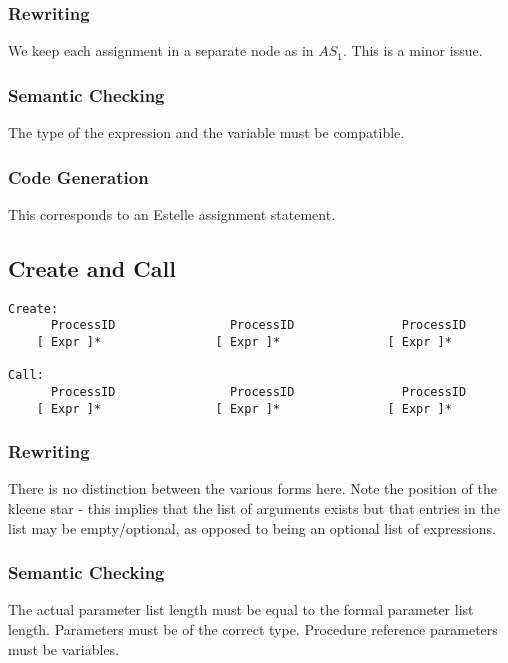 \subsubsection{Rewriting}

We keep each assignment in a separate node as in $AS_1$. This is a
minor issue.

\subsubsection{Semantic Checking}

The type of the expression and the variable must be compatible.

\subsubsection{Code Generation}

This corresponds to an Estelle assignment statement.

\subsection{Create and Call}

\begin{verbatim}
Create:
      ProcessID                ProcessID               ProcessID
    [ Expr ]*                [ Expr ]*               [ Expr ]*

Call:
      ProcessID                ProcessID               ProcessID
    [ Expr ]*                [ Expr ]*               [ Expr ]*
\end{verbatim}

\subsubsection{Rewriting}

There is no distinction between the various forms here. Note the
position of the kleene star - this implies that the list of arguments
exists but that entries in the list may be empty/optional,
as opposed to being an optional list of expressions.

\subsubsection{Semantic Checking}

The actual parameter list length must be equal to the formal
parameter list length.
Parameters must be of the correct type.
Procedure reference parameters must be variables.

